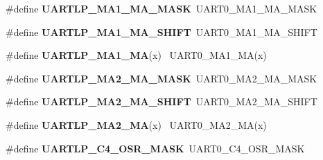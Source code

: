 \begin{DoxyCompactItemize}
\item 
\hypertarget{group___backward___compatibility___symbols_ga187ea00ba1985df3b626c8d88897d693}{}\#define {\bfseries U\+A\+R\+T\+L\+P\+\_\+\+M\+A1\+\_\+\+M\+A\+\_\+\+M\+A\+S\+K}~U\+A\+R\+T0\+\_\+\+M\+A1\+\_\+\+M\+A\+\_\+\+M\+A\+S\+K\label{group___backward___compatibility___symbols_ga187ea00ba1985df3b626c8d88897d693}

\item 
\hypertarget{group___backward___compatibility___symbols_ga62055de0c9859d4d9308b092e5fee5e9}{}\#define {\bfseries U\+A\+R\+T\+L\+P\+\_\+\+M\+A1\+\_\+\+M\+A\+\_\+\+S\+H\+I\+F\+T}~U\+A\+R\+T0\+\_\+\+M\+A1\+\_\+\+M\+A\+\_\+\+S\+H\+I\+F\+T\label{group___backward___compatibility___symbols_ga62055de0c9859d4d9308b092e5fee5e9}

\item 
\hypertarget{group___backward___compatibility___symbols_ga4b462fa501fa6679d3de5ea3d0f3c5c7}{}\#define {\bfseries U\+A\+R\+T\+L\+P\+\_\+\+M\+A1\+\_\+\+M\+A}(x)                                              ~U\+A\+R\+T0\+\_\+\+M\+A1\+\_\+\+M\+A(x)\label{group___backward___compatibility___symbols_ga4b462fa501fa6679d3de5ea3d0f3c5c7}

\item 
\hypertarget{group___backward___compatibility___symbols_gaf7ea6dd269e7c9e321d53599db756e75}{}\#define {\bfseries U\+A\+R\+T\+L\+P\+\_\+\+M\+A2\+\_\+\+M\+A\+\_\+\+M\+A\+S\+K}~U\+A\+R\+T0\+\_\+\+M\+A2\+\_\+\+M\+A\+\_\+\+M\+A\+S\+K\label{group___backward___compatibility___symbols_gaf7ea6dd269e7c9e321d53599db756e75}

\item 
\hypertarget{group___backward___compatibility___symbols_ga85f77220a0349e3a2862f9d08f670133}{}\#define {\bfseries U\+A\+R\+T\+L\+P\+\_\+\+M\+A2\+\_\+\+M\+A\+\_\+\+S\+H\+I\+F\+T}~U\+A\+R\+T0\+\_\+\+M\+A2\+\_\+\+M\+A\+\_\+\+S\+H\+I\+F\+T\label{group___backward___compatibility___symbols_ga85f77220a0349e3a2862f9d08f670133}

\item 
\hypertarget{group___backward___compatibility___symbols_ga7712e7e668aca973f728609d887e6492}{}\#define {\bfseries U\+A\+R\+T\+L\+P\+\_\+\+M\+A2\+\_\+\+M\+A}(x)                                              ~U\+A\+R\+T0\+\_\+\+M\+A2\+\_\+\+M\+A(x)\label{group___backward___compatibility___symbols_ga7712e7e668aca973f728609d887e6492}

\item 
\hypertarget{group___backward___compatibility___symbols_gac6bfd7069bc2ce77d0aff3aecdd3d330}{}\#define {\bfseries U\+A\+R\+T\+L\+P\+\_\+\+C4\+\_\+\+O\+S\+R\+\_\+\+M\+A\+S\+K}~U\+A\+R\+T0\+\_\+\+C4\+\_\+\+O\+S\+R\+\_\+\+M\+A\+S\+K\label{group___backward___compatibility___symbols_gac6bfd7069bc2ce77d0aff3aecdd3d330}


\end{DoxyCompactItemize}
